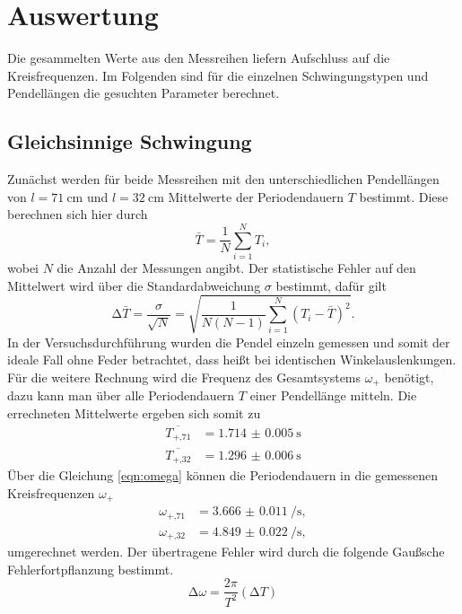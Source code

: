 \section{Auswertung}

Die gesammelten Werte aus den Messreihen liefern Aufschluss auf die Kreisfrequenzen. Im Folgenden sind für die einzelnen Schwingungstypen und Pendellängen die gesuchten Parameter berechnet.

\subsection{Gleichsinnige Schwingung}
Zunächst werden für beide Messreihen mit den unterschiedlichen Pendellängen von $l = \SI{71}{\centi\meter}$ und $l = \SI{32}{\centi\meter}$ Mittelwerte der Periodendauern $T$ bestimmt.
Diese berechnen sich hier durch 
\begin{equation}
    \label{eqn:mean}
\bar{T} = \frac{1}{N} \sum_{i=1}^{N} T_{i},
\end{equation}
wobei $N$ die Anzahl der Messungen angibt. Der statistische Fehler auf den Mittelwert wird über die Standardabweichung $\sigma$ bestimmt, dafür gilt
\begin{equation}
    \label{eqn:sem}
\increment \bar{T} = \frac{\sigma}{\sqrt{N}} = \sqrt{\frac{1}{N(N-1)} \sum_{i=1}^{N} (T_{i} - \bar{T})^{2}}.
\end{equation}
In der Versuchsdurchführung wurden die Pendel einzeln gemessen und somit der ideale Fall ohne Feder betrachtet, dass heißt bei identischen Winkelauslenkungen.
Für die weitere Rechnung wird die Frequenz des Gesamtsystems $\omega_{+}$ benötigt, dazu kann man über alle Periodendauern $T$ einer Pendellänge mitteln.
Die errechneten Mittelwerte ergeben sich somit zu
\begin{align*}
    \overline{T_{+\text{,}71}} &= \SI{1.714(5)}{\second} \\
    \overline{T_{+\text{,}32}} &= \SI{1.296(6)}{\second} 
\end{align*}
Über die Gleichung \eqref{eqn:omega} können die Periodendauern in die gemessenen Kreisfrequenzen $\omega_{+}$ 
\begin{align*}
    \omega_{+\text{,}71} &= \SI{3.666(11)}{\per\second}, \\
    \omega_{+\text{,}32} &= \SI{4.849(22)}{\per\second}, 
\end{align*}
umgerechnet werden. Der übertragene Fehler wird durch die folgende Gaußsche Fehlerfortpflanzung bestimmt.
\begin{equation}
    \label{eqn:gauss}
\increment \omega = \frac{2 \pi}{T^2} (\increment T)
\end{equation}

